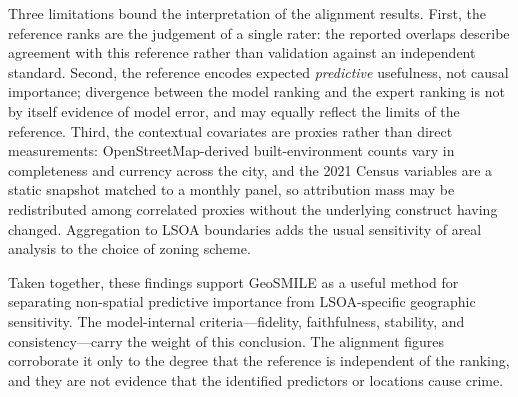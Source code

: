 Three limitations bound the interpretation of the alignment results. First, the reference ranks are the judgement of a single rater: the reported overlaps describe agreement with this reference rather than validation against an independent standard. Second, the reference encodes expected \emph{predictive} usefulness, not causal importance; divergence between the model ranking and the expert ranking is not by itself evidence of model error, and may equally reflect the limits of the reference. Third, the contextual covariates are proxies rather than direct measurements: OpenStreetMap-derived built-environment counts vary in completeness and currency across the city, and the 2021 Census variables are a static snapshot matched to a monthly panel, so attribution mass may be redistributed among correlated proxies without the underlying construct having changed. Aggregation to LSOA boundaries adds the usual sensitivity of areal analysis to the choice of zoning scheme.

Taken together, these findings support GeoSMILE as a useful method for separating non-spatial predictive importance from LSOA-specific geographic sensitivity. The model-internal criteria---fidelity, faithfulness, stability, and consistency---carry the weight of this conclusion. The alignment figures corroborate it only to the degree that the reference is independent of the ranking, and they are not evidence that the identified predictors or locations cause crime.
